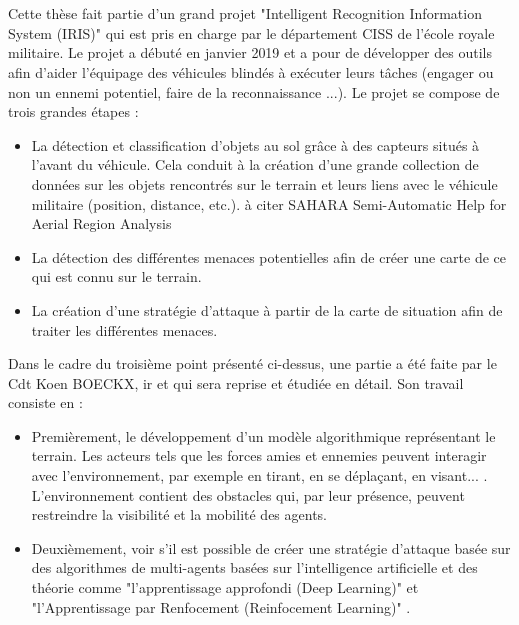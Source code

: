 \chapter{}
\section{}

Cette thèse fait partie d'un grand projet "Intelligent Recognition Information System (IRIS)" qui est pris en charge par le département CISS de l'école royale militaire. Le projet a débuté en janvier 2019 et a pour de développer des outils afin d'aider l'équipage des véhicules blindés à exécuter leurs tâches (engager ou non un ennemi potentiel, faire de la reconnaissance ...). Le projet se compose de trois grandes étapes : 
\begin{itemize}
    \item La détection et classification d'objets au sol grâce à des capteurs situés à l'avant du véhicule. Cela conduit à la création d'une grande collection de données sur les objets rencontrés sur le terrain et leurs liens avec le véhicule militaire (position, distance, etc.). {à citer SAHARA
Semi-Automatic Help for Aerial Region Analysis}
    \item La détection des différentes menaces potentielles afin de créer une carte de ce qui est connu sur le terrain.
    \item La création d'une stratégie d'attaque à partir de la carte de situation afin de traiter les différentes menaces.
\end{itemize}

Dans le cadre du troisième point présenté ci-dessus, une partie a été faite par le Cdt Koen BOECKX, ir et qui sera reprise et étudiée en détail. Son travail consiste en : 
\begin{itemize}
    \item Premièrement, le développement d'un modèle algorithmique représentant le terrain. Les acteurs tels que les forces amies et ennemies peuvent interagir avec l'environnement, par exemple en tirant, en se déplaçant, en visant... . L'environnement contient des obstacles qui, par leur présence, peuvent restreindre la visibilité et la mobilité des agents. 
    \item Deuxièmement, voir s'il est possible de créer une stratégie d'attaque basée sur des algorithmes de multi-agents basées sur l'intelligence artificielle et des théorie comme "l'apprentissage approfondi (Deep Learning)" et "l'Apprentissage par Renfocement (Reinfocement Learning)" .
\end{itemize}






\section{}